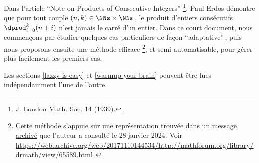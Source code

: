 Dans l'article \enquote{Note on Products of Consecutive Integers}
\footnote{
	J. London Math. Soc. 14 (1939).
},
Paul Erdos démontre que pour tout couple $(n, k) \in \NNs \times \NNs$\,, le produit d'entiers consécutifs $\dprod_{i = 0}^{k} (n + i)$ n'est jamais le carré d'un entier. Dans ce court document, nous commençons par étudier quelques cas particuliers de façon \enquote{adaptative}\,, puis nous proposons ensuite une méthode efficace
\footnote{
	Cette méthode s'appuie sur une représentation trouvée dans \href{https://web.archive.org/web/20171110144534/http://mathforum.org/library/drmath/view/65589.html}{un message archivé} que l'auteur a consulté le 28 janvier 2024.
	Voir \url{https://web.archive.org/web/20171110144534/http://mathforum.org/library/drmath/view/65589.html}\,.
},
et semi-automatisable, pour gérer plus facilement les premiers cas. 


\begin{remark}
	Les sections \ref{lazzy-is-easy} et \ref{warmup-your-brain} peuvent être lues indépendamment l'une de l'autre.
\end{remark}

